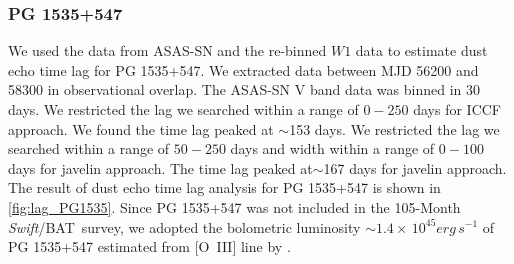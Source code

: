 \documentclass[linenumbers]{aastex631}
\newcommand{\bat}{{\small {\it Swift}/BAT}}
\begin{document}
\subsubsection{PG 1535+547}
We used the data from ASAS-SN and the re-binned $W1$ data to estimate dust echo time lag for PG 1535+547. We extracted data between MJD 56200 and 58300 in observational overlap. The ASAS-SN V band data was binned in 30 days. We restricted the lag we searched within a range of $0-250$ days for ICCF approach. We found the time lag peaked at $\sim$153 days. We restricted the lag we searched within a range of $50-250$ days and width within a range of $0-100$ days for {\sc javelin} approach. The time lag peaked at$\sim$167 days for {\sc javelin} approach. The result of dust echo time lag analysis for PG 1535+547 is shown in \autoref{fig:lag_PG1535}. Since PG 1535+547 was not included in the 105-Month \bat\, survey, we adopted the bolometric luminosity $\sim 1.4\times \, 10^{45} erg\, s^{-1}$ of PG 1535+547 estimated from [O~{\small III}] line by \citet{2006ApJ...653..137Z}.
\end{document}

